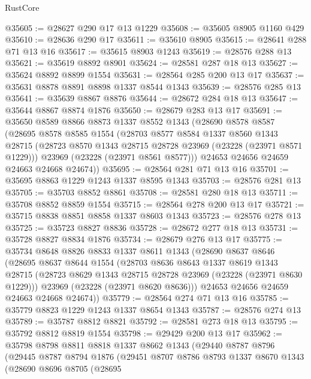 \begin{lexlean}{RustCore}
\begin{coremodule}
@35605 := @28627 @290 @17 @13 @1229
@35608 := @35605 @8905 @1160 @429
@35610 := @28636 @290 @17
@35611 := @35610 @8905
@35615 := @28641 @288 @71 @13 @16
@35617 := @35615 @8903 @1243
@35619 := @28576 @288 @13
@35621 := @35619 @8892 @8901
@35624 := @28581 @287 @18 @13
@35627 := @35624 @8892 @8899 @1554
@35631 := @28564 @285 @200 @13 @17
@35637 := @35631 @8878 @8891 @8898 @1337 @8544 @1343
@35639 := @28576 @285 @13
@35641 := @35639 @8867 @8876
@35644 := @28672 @284 @18 @13
@35647 := @35644 @8867 @8874 @1876
@35650 := @28679 @283 @13 @17
@35691 := @35650
    @8589
    @8866
    @8873
    @1337
    @8552
    @1343
    (@28690
      @8578
      @8587
      (@28695
        @8578
        @8585
        @1554
        (@28703
          @8577
          @8584
          @1337
          @8560
          @1343
          @28715
          (@28723 @8570 @1343 @28715 @28728 @23969 (@23228 (@23971 @8571 @1229)))
          @23969
          (@23228 (@23971 @8561 @8577)))
        @24653
        @24656
        @24659
        @24663
        @24668
        @24674))
@35695 := @28564 @281 @71 @13 @16
@35701 := @35695 @8863 @1229 @1243 @1337 @8595 @1343
@35703 := @28576 @281 @13
@35705 := @35703 @8852 @8861
@35708 := @28581 @280 @18 @13
@35711 := @35708 @8852 @8859 @1554
@35715 := @28564 @278 @200 @13 @17
@35721 := @35715 @8838 @8851 @8858 @1337 @8603 @1343
@35723 := @28576 @278 @13
@35725 := @35723 @8827 @8836
@35728 := @28672 @277 @18 @13
@35731 := @35728 @8827 @8834 @1876
@35734 := @28679 @276 @13 @17
@35775 := @35734
    @8648
    @8826
    @8833
    @1337
    @8611
    @1343
    (@28690
      @8637
      @8646
      (@28695
        @8637
        @8644
        @1554
        (@28703
          @8636
          @8643
          @1337
          @8619
          @1343
          @28715
          (@28723 @8629 @1343 @28715 @28728 @23969 (@23228 (@23971 @8630 @1229)))
          @23969
          (@23228 (@23971 @8620 @8636)))
        @24653
        @24656
        @24659
        @24663
        @24668
        @24674))
@35779 := @28564 @274 @71 @13 @16
@35785 := @35779 @8823 @1229 @1243 @1337 @8654 @1343
@35787 := @28576 @274 @13
@35789 := @35787 @8812 @8821
@35792 := @28581 @273 @18 @13
@35795 := @35792 @8812 @8819 @1554
@35798 := @29429 @200 @13 @17
@35962 := @35798
    @8798
    @8811
    @8818
    @1337
    @8662
    @1343
    (@29440
      @8787
      @8796
      (@29445
        @8787
        @8794
        @1876
        (@29451
          @8707
          @8786
          @8793
          @1337
          @8670
          @1343
          (@28690
            @8696
            @8705
            (@28695

\end{coremodule}
\end{lexlean}

